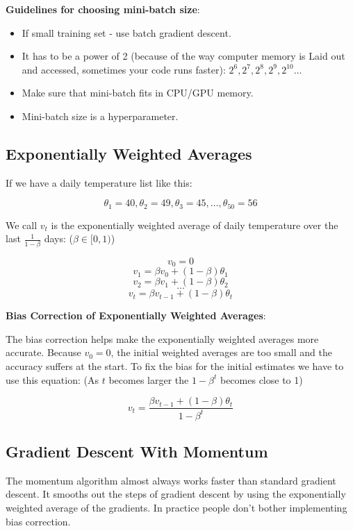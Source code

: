 \documentclass{article}
\begin{document}
\noindent \textbf{Guidelines for choosing mini-batch size}:

\begin{itemize}
  \item If small training set - use batch gradient descent.
  \item It has to be a power of 2 (because of the way computer memory is Laid out and accessed, sometimes your code runs faster): \(2^{6}, 2^{7}, 2^{8}, 2^{9}, 2^{10} \dots\)
  \item Make sure that mini-batch fits in CPU/GPU memory.
  \item Mini-batch size is a hyperparameter.
\end{itemize}

\subsection{Exponentially Weighted Averages}

\noindent If we have a daily temperature list like this:

\[\theta_{1} = 40, \theta_{2} = 49, \theta_{3} = 45, \dots, \theta_{50} = 56\]

\noindent We call \(v_{t}\) is the exponentially weighted average of daily temperature over the last \(\frac{1}{1 - \beta}\) days: (\(\beta \in [0, 1)\))

\[v_{0} = 0\]
\[v_{1} = \beta v_{0} + (1 - \beta) \theta_{1}\]
\[v_{2} = \beta v_{1} + (1 - \beta) \theta_{2}\]
\[\dots\]
\[v_{t} = \beta v_{t - 1} + (1 - \beta) \theta_{t}\]

\noindent \textbf{Bias Correction of Exponentially Weighted Averages}:

\noindent The bias correction helps make the exponentially weighted averages more accurate. Because \(v_{0} = 0\), the initial weighted averages are too small and the accuracy suffers at the start. To fix the bias for the initial estimates we have to use this equation: (As \(t\) becomes larger the \(1 - \beta^{t}\) becomes close to 1)

\[v_{t} = \frac{\beta v_{t - 1} + (1 - \beta) \theta_{t}}{1 - \beta^{t}}\]

\subsection{Gradient Descent With Momentum}

\noindent The momentum algorithm almost always works faster than standard gradient descent. It smooths out the steps of gradient descent by using the exponentially weighted average of the gradients. In practice people don't bother implementing bias correction.
\end{document}
